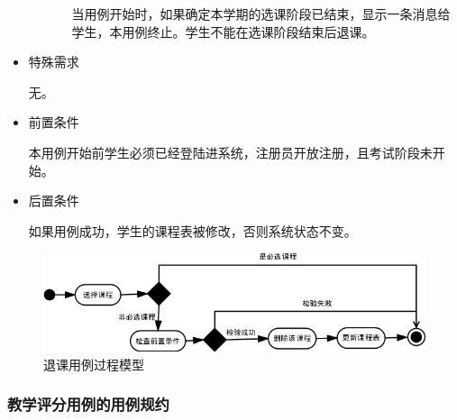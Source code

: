 \begin{itemize}
\begin{enumerate}
\begin{enumerate}[{2}.1]
      \CJKindent 当用例开始时，如果确定本学期的选课阶段已结束，显示一条消息给学生，本用例终止。学生不能在选课阶段结束后退课。
    \end{enumerate}
  \end{enumerate}
  
  \item 特殊需求
  
  \CJKindent 无。
  
  \item 前置条件
  
  \CJKindent 本用例开始前学生必须已经登陆进系统，注册员开放注册，且考试阶段未开始。
  
  \item 后置条件
  
  \CJKindent 如果用例成功，学生的课程表被修改，否则系统状态不变。
\end{itemize}

\begin{figure}[H]
  \centering
  \includegraphics[scale=0.7]{img/jwxt_dcourse.png}
  \caption{退课用例过程模型}
\end{figure}

\subsubsection{教学评分用例的用例规约}

